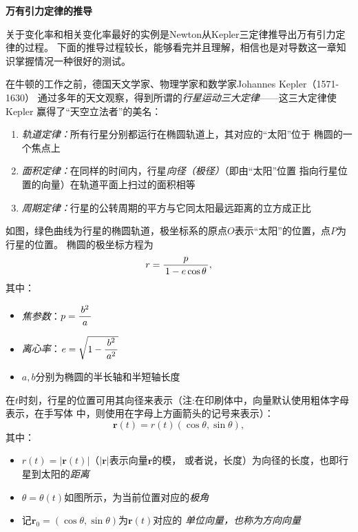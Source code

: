 \begin{shaded}
	{\bf 万有引力定律的推导}
	
	关于变化率和相关变化率最好的实例是Newton从Kepler三定律推导出万有引力定律的过程。
	下面的推导过程较长，能够看完并且理解，相信也是对导数这一章知识掌握情况一种很好的测试。

	在牛顿的工作之前，德国天文学家、物理学家和数学家Johannes Kepler（1571-1630）
	通过多年的天文观察，得到所谓的{\it 行星运动三大定律}——这三大定律使Kepler
	赢得了“天空立法者”的美名：
	\begin{enumerate}
	  \item {\it 轨道定律：}所有行星分别都运行在椭圆轨道上，其对应的“太阳”位于
	  椭圆的一个焦点上
	  \item {\it 面积定律：}在同样的时间内，行星{\it 向径（极径）}（即由“太阳”位置
	  指向行星位置的向量）在轨道平面上扫过的面积相等
	  \item {\it 周期定律：}行星的公转周期的平方与它同太阳最远距离的立方成正比 
	\end{enumerate}
	
	\begin{center}
	\end{center}
	
	如图，绿色曲线为行星的椭圆轨道，极坐标系的原点$O$表示“太阳”的位置，点$P$为行星的位置。
	椭圆的极坐标方程为
	$$r=\displaystyle\frac{\,{p}\,}{\,{1-e\cos\theta}\,},$$
	其中：
	\begin{itemize}
	  \item {\it 焦参数}：$p=\displaystyle\frac{\,{b^2}\,}{\,{a}\,}$
	  \item {\it 离心率}：$e=\sqrt{1-\displaystyle\frac{\,{b^2}\,}{\,{a^2}\,}}$
	  \item $a,b$分别为椭圆的半长轴和半短轴长度
	\end{itemize}
	
	在$t$时刻，行星的位置可用其向径来表示（注:在印刷体中，向量默认使用粗体字母表示，在手写体
	中，则使用在字母上方画箭头的记号来表示）：
	$$\bm{r}(t)=r(t)(\cos\theta,\sin\theta),$$
	其中：
	\begin{itemize}
	  \item $r(t)=|\bm{r}(t)|$（$|\bm{r}|$表示向量$\bm{r}$的模，
	  或者说，长度）为向径的长度，也即行星到太阳的{\it 距离}
	  \item $\theta=\theta(t)$如图所示，为当前位置对应的{\it 极角}
	  \item 记$\bm{r}_0=(\cos\theta,\sin\theta)$为$\bm{r}(t)$对应的
	  {\it 单位向量，也称为方向向量}
	\end{itemize}
	

\end{shaded}
